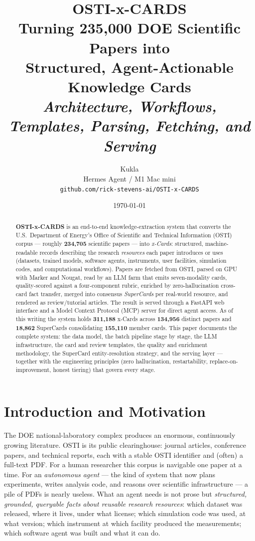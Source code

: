 \documentclass[11pt,letterpaper]{article}
\title{\color{KuklaInk}\Huge\textbf{OSTI-x-CARDS}\\[6pt]
  \large\color{KuklaAccent}Turning 235{,}000 DOE Scientific Papers into\\
  Structured, Agent-Actionable Knowledge Cards\\[10pt]
  \normalsize\color{KuklaInk}\emph{Architecture, Workflows, Templates, Parsing, Fetching, and Serving}}
\author{Kukla \\ \small Hermes Agent / M1 Mac mini \\ \small \texttt{github.com/rick-stevens-ai/OSTI-x-CARDS}}
\date{\today}
\begin{document}
\maketitle
\thispagestyle{fancy}

\begin{abstract}
\noindent
\textbf{OSTI-x-CARDS} is an end-to-end knowledge-extraction system that converts the
U.S.\ Department of Energy's Office of Scientific and Technical Information (OSTI)
corpus --- roughly \textbf{234{,}705} scientific papers --- into \emph{x-Cards}:
structured, machine-readable records describing the research \emph{resources} each
paper introduces or uses (datasets, trained models, software agents, instruments,
user facilities, simulation codes, and computational workflows). Papers are fetched
from OSTI, parsed on GPU with Marker and Nougat, read by an LLM farm that emits
seven-modality cards, quality-scored against a four-component rubric, enriched by
zero-hallucination cross-card fact transfer, merged into consensus \emph{SuperCards}
per real-world resource, and rendered as review/tutorial articles. The result is
served through a FastAPI web interface and a Model Context Protocol (MCP) server for
direct agent access. As of this writing the system holds \textbf{311{,}188} x-Cards
across \textbf{134{,}956} distinct papers and \textbf{18{,}862} SuperCards
consolidating \textbf{155{,}110} member cards. This paper documents the complete
system: the data model, the batch pipeline stage by stage, the LLM infrastructure,
the card and review templates, the quality and enrichment methodology, the SuperCard
entity-resolution strategy, and the serving layer --- together with the engineering
principles (zero hallucination, restartability, replace-on-improvement, honest
tiering) that govern every stage.
\end{abstract}

\vspace{0.5em}
\tableofcontents
\clearpage

\section{Introduction and Motivation}

The DOE national-laboratory complex produces an enormous, continuously growing
literature. OSTI is its public clearinghouse: journal articles, conference papers,
and technical reports, each with a stable OSTI identifier and (often) a full-text
PDF. For a human researcher this corpus is navigable one paper at a time. For an
\emph{autonomous agent} --- the kind of system that now plans experiments, writes
analysis code, and reasons over scientific infrastructure --- a pile of PDFs is
nearly useless. What an agent needs is not prose but \emph{structured, grounded,
queryable facts about reusable research resources}: which dataset was released,
where it lives, under what license; which simulation code was used, at what version;
which instrument at which facility produced the measurements; which software agent
was built and what it can do.
\end{document}
